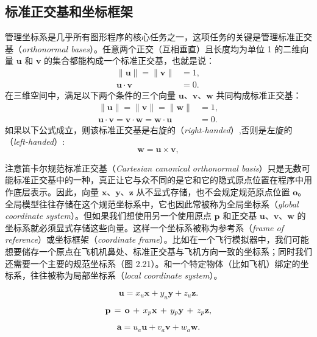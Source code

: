 \documentclass[lang=cn,12pt,marginpar=margintrue]{elegantbook}
\begin{document}
\subsection{标准正交基和坐标框架}

管理坐标系是几乎所有图形程序的核心任务之一，这项任务的关键是管理标准正交基（\textit{orthonormal bases}）。任意两个正交（互相垂直）且长度均为单位 1 的二维向量 $\mathbf{u}$ 和 $\mathbf{v}$ 的集合都能构成一个标准正交基，也就是说：
\[
  \begin{aligned}
    \|\mathbf{u}\|=\|\mathbf{v}\| & =1, \\
    \mathbf{u}\cdot\mathbf{v}     & =0.
  \end{aligned}
\]
在三维空间中，满足以下两个条件的三个向量 $\mathbf{u}$、$\mathbf{v}$、$\mathbf{w}$ 共同构成标准正交基：
\[
  \begin{aligned}
    \|\mathbf{u}\|=\|\mathbf{v}\|=\|\mathbf{w}\|                                  & =1, \\
    \mathbf{u}\cdot\mathbf{v}=\mathbf{v}\cdot\mathbf{w}=\mathbf{w}\cdot\mathbf{u} & =0.
  \end{aligned}
\]
如果以下公式成立，则该标准正交基是右旋的（\textit{right-handed}）,否则是左旋的（\textit{left-handed}）:
\[
  \mathbf{w}=\mathbf{u}\times\mathbf{v},
\]

注意笛卡尔规范标准正交基（\textit{Cartesian canonical orthonormal basis}）只是无数可能标准正交基中的一种，真正让它与众不同的是它和它的隐式原点位置在程序中用作底层表示。因此，向量 $\mathbf{x}$、$\mathbf{y}$、$\mathbf{z}$ 从不显式存储，也不会规定规范原点位置 $\mathbf{o}$。全局模型往往存储在这个规范坐标系中，它也因此常被称为全局坐标系（\textit{global coordinate system}）。但如果我们想使用另一个使用原点 $\mathbf{p}$ 和正交基 $\mathbf{u}$、$\mathbf{v}$、$\mathbf{w}$ 的坐标系就必须显式存储这些向量。这样一个坐标系被称为参考系（\textit{frame of reference}）或坐标框架（\textit{coordinate frame}）。比如在一个飞行模拟器中，我们可能想要储存一个原点在飞机机鼻处、标准正交基与飞机方向一致的坐标系；同时我们还需要一个主要的规范坐标系（图 2.21）。和一个特定物体（比如飞机）绑定的坐标系，往往被称为局部坐标系（\textit{local coordinate system}）。



\[
  \mathbf{u}=x_{u}\mathbf{x}+y_{u}\mathbf{y}+z_{u}\mathbf{z}.
\]

\[
  {\bf p}\,=\,{\bf o}\,+\,x_{p}{\bf x}\,+\,y_{p}{\bf y}\,+\,z_{p}{\bf z},
\]

\[
  \mathbf{a}=u_{a}\mathbf{u}+v_{a}\mathbf{v}+w_{a}\mathbf{w}.
\]
\end{document}
